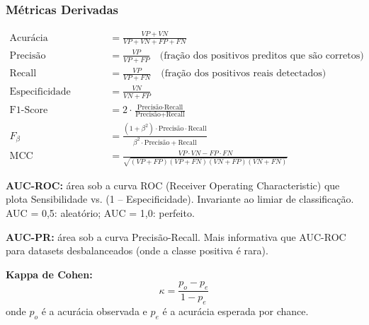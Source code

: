 \documentclass[12pt,a4paper]{article}
\begin{document}
\begin{center}
\end{center}

\subsubsection{Métricas Derivadas}

\begin{align}
  \text{Acurácia} &= \frac{VP + VN}{VP + VN + FP + FN} \\[4pt]
  \text{Precisão} &= \frac{VP}{VP + FP} \quad \text{(fração dos positivos preditos que são corretos)} \\[4pt]
  \text{Recall (Sensibilidade)} &= \frac{VP}{VP + FN} \quad \text{(fração dos positivos reais detectados)} \\[4pt]
  \text{Especificidade} &= \frac{VN}{VN + FP} \\[4pt]
  \text{F1-Score} &= 2 \cdot \frac{\text{Precisão} \cdot \text{Recall}}{\text{Precisão} + \text{Recall}} \\[4pt]
  F_\beta &= \frac{(1+\beta^2) \cdot \text{Precisão} \cdot \text{Recall}}{\beta^2 \cdot \text{Precisão} + \text{Recall}} \\[4pt]
  \text{MCC} &= \frac{VP \cdot VN - FP \cdot FN}{\sqrt{(VP+FP)(VP+FN)(VN+FP)(VN+FN)}}
\end{align}

\textbf{AUC-ROC:} área sob a curva ROC (Receiver Operating Characteristic) que plota Sensibilidade vs. (1 -- Especificidade). Invariante ao limiar de classificação. AUC = 0,5: aleatório; AUC = 1,0: perfeito.

\textbf{AUC-PR:} área sob a curva Precisão-Recall. Mais informativa que AUC-ROC para datasets desbalanceados (onde a classe positiva é rara).

\textbf{Kappa de Cohen:}
\[
  \kappa = \frac{p_o - p_e}{1 - p_e}
\]
onde $p_o$ é a acurácia observada e $p_e$ é a acurácia esperada por chance.
\end{document}
